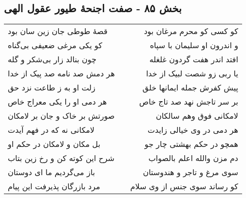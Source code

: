 \begin{center}
\section*{بخش ۸۵ - صفت اجنحهٔ طیور عقول الهی}
\label{sec:sh085}
\begin{longtable}{l p{0.5cm} r}
قصهٔ طوطی جان زین سان بود
&&
کو کسی کو محرم مرغان بود
\\
کو یکی مرغی ضعیفی بی‌گناه
&&
و اندرون او سلیمان با سپاه
\\
چون بنالد زار بی‌شکر و گله
&&
افتد اندر هفت گردون غلغله
\\
هر دمش صد نامه صد پیک از خدا
&&
یا ربی زو شصت لبیک از خدا
\\
زلت او به ز طاعت نزد حق
&&
پیش کفرش جمله ایمانها خلق
\\
هر دمی او را یکی معراج خاص
&&
بر سر تاجش نهد صد تاج خاص
\\
صورتش بر خاک و جان بر لامکان
&&
لامکانی فوق وهم سالکان
\\
لامکانی نه که در فهم آیدت
&&
هر دمی در وی خیالی زایدت
\\
بل مکان و لامکان در حکم او
&&
همچو در حکم بهشتی چار جو
\\
شرح این کوته کن و رخ زین بتاب
&&
دم مزن والله اعلم بالصواب
\\
باز می‌گردیم ما ای دوستان
&&
سوی مرغ و تاجر و هندوستان
\\
مرد بازرگان پذیرفت این پیام
&&
کو رساند سوی جنس از وی سلام
\\
\end{longtable}
\end{center}
